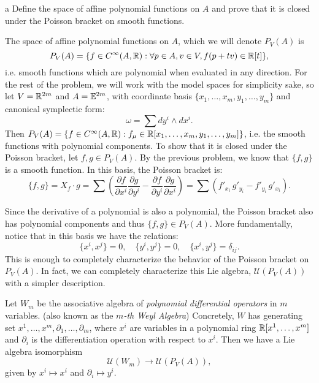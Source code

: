 \documentclass{pset}
\begin{document}
\begin{parts}
    \begin{part}{a}
        Define the space of affine polynomial functions on $A$ and prove that it is closed under the Poisson bracket on smooth functions.
    \end{part}

    The space of affine polynomial functions on $A$, which we will denote $P_V(A)$ is
    \[
        P_V(A) = \{ f\in C^\infty(A, \mathbb{R}) : \forall p\in A, v\in V, f(p+tv)\in \mathbb{R}[t]\},
    \]
    i.e. smooth functions which are polynomial when evaluated in any direction. For the rest of the problem, we will work with the model spaces for simplicity sake, so let $V=\mathbb{R}^{2m}$ and $A=\mathbb{E}^{2m}$, with coordinate basis $\{x_1,\ldots,x_m, y_1,\ldots,y_m\}$ and canonical symplectic form:
    \[
        \omega = \sum dy^i\wedge dx^i 
    .\] 
    Then $P_V(A)=\{f \in C^\infty(A,\mathbb{R}) : f_{\mu}\in \mathbb{R}[x_1, \ldots, x_m, y_1,\ldots,y_m]\}$, i.e. the smooth functions with polynomial components. To show that it is closed under the Poisson bracket, let $f,g\in P_V(A)$. By the previous problem, we know that $\{f,g\}$ is a smooth function. In this basis, the Poisson bracket is:
    \[
       \{f,g\} = X_f\cdot g = \sum\left(\frac{\partial f}{\partial x^i}\frac{\partial g}{\partial y^i} - \frac{\partial f}{\partial y^i}\frac{\partial g}{\partial x^i}\right) = \sum\left(f'_{x_i}\,g'_{y_i} - f'_{y_i}\,g'_{x_i}\right)
    .\] 
    
    Since the derivative of a polynomial is also a polynomial, the Poisson bracket also has polynomial components and thus $\{f,g\}\in P_V(A)$. More fundamentally, notice that in this basis we have the relations:
    \[
        \{x^i, x^j\} = 0, \quad \{y^i,y^j\}=0,\quad \{x^i, y^j\} = \delta_{ij}
    .\]
    This is enough to completely characterize the behavior of the Poisson bracket on $P_V(A)$. In fact, we can completely characterize this Lie algebra, $\mathcal{U}(P_V(A))$ with a simpler description.

    \begin{claim}
        Let $W_m$ be the associative algebra of \emph{polynomial differential operators} in $m$ variables. (also known as the \emph{$m$-th Weyl Algebra}) Concretely, $W$ has generating set $x^1,\ldots,x^m, \partial_1, \ldots,\partial_m$, where $x^i$ are variables in a polynomial ring $\mathbb{R}[x^1,\ldots,x^m]$ and $\partial_i$ is the differentiation operation with respect to $x^i$. Then we have a Lie algebra isomorphism
        \[
            \mathcal{U}(W_m) \to \mathcal{U}(P_V(A)),
        \] 
        given by $x^i \mapsto x^i$ and $\partial_i \mapsto y^i$.    
    \end{claim}


\end{parts}
\end{document}

